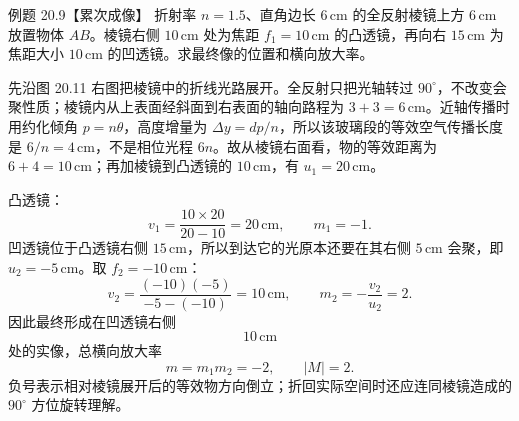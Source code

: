 \begin{origexamplebox}{例题 20.9【累次成像】}
折射率 $n=1.5$、直角边长 $6\,\mathrm{cm}$ 的全反射棱镜上方 $6\,\mathrm{cm}$ 放置物体 $AB$。棱镜右侧 $10\,\mathrm{cm}$ 处为焦距 $f_1=10\,\mathrm{cm}$ 的凸透镜，再向右 $15\,\mathrm{cm}$ 为焦距大小 $10\,\mathrm{cm}$ 的凹透镜。求最终像的位置和横向放大率。
\end{origexamplebox}
\begin{xesolution}
先沿图 20.11 右图把棱镜中的折线光路展开。全反射只把光轴转过 $90^\circ$，不改变会聚性质；棱镜内从上表面经斜面到右表面的轴向路程为 $3+3=6\,\mathrm{cm}$。近轴传播时用约化倾角 $p=n\theta$，高度增量为 $\Delta y=dp/n$，所以该玻璃段的等效空气传播长度是 $6/n=4\,\mathrm{cm}$，不是相位光程 $6n$。故从棱镜右面看，物的等效距离为 $6+4=10\,\mathrm{cm}$；再加棱镜到凸透镜的 $10\,\mathrm{cm}$，有 $u_1=20\,\mathrm{cm}$。

凸透镜：
\[
 v_1=\frac{10\times20}{20-10}=20\,\mathrm{cm},\qquad m_1=-1.
\]
凹透镜位于凸透镜右侧 $15\,\mathrm{cm}$，所以到达它的光原本还要在其右侧 $5\,\mathrm{cm}$ 会聚，即 $u_2=-5\,\mathrm{cm}$。取 $f_2=-10\,\mathrm{cm}$：
\[
 v_2=\frac{(-10)(-5)}{-5-(-10)}=10\,\mathrm{cm},\qquad m_2=-\frac{v_2}{u_2}=2.
\]
因此最终形成在凹透镜右侧
\[
 \boxed{10\,\mathrm{cm}}
\]
处的实像，总横向放大率
\[
 \boxed{m=m_1m_2=-2,\qquad |M|=2}.
\]
负号表示相对棱镜展开后的等效物方向倒立；折回实际空间时还应连同棱镜造成的 $90^\circ$ 方位旋转理解。
\end{xesolution}

